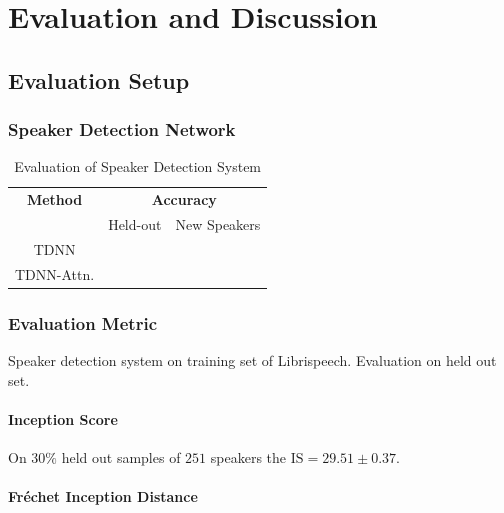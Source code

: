 \chapter{Evaluation and Discussion}
\label{ch:results}

\section{Evaluation Setup}
\label{sec:res}


\subsection{Speaker Detection Network}
\label{subsec:sdn}
\begin{table}[]
    \centering
    \begin{tabular}{c|cc}
    \toprule
    \textbf{Method} & \multicolumn{2}{c}{\textbf{Accuracy}}\\
    & Held-out & New Speakers \\
    \midrule
        TDNN &  &\\
        TDNN-Attn. & &\\
    \end{tabular}
    \caption{Evaluation of Speaker Detection System}
    \label{tab:data_stat}
\end{table}

\subsection{Evaluation Metric}
\label{subsec:eval_metrics}
Speaker detection system on training set of Librispeech. 
Evaluation on held out set.
\subsubsection{Inception Score}
\label{subsec:inception_score}
On $30\%$ held out samples of $251$ speakers the $\text{IS}=29.51\pm 0.37$. 
\subsubsection{Fr\'{e}chet Inception Distance}


